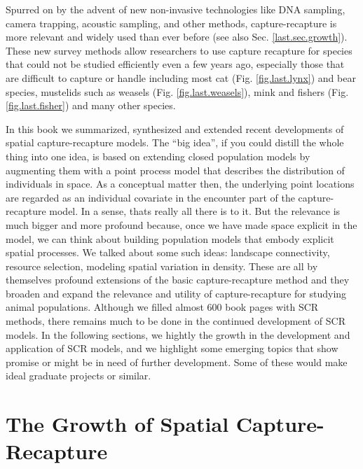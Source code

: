 Spurred on by the advent of new non-invasive technologies like DNA
sampling, camera trapping, acoustic sampling, and other methods,
capture-recapture is more relevant and widely used than ever before
(see also Sec. \ref{last.sec.growth}).  These new survey methods allow
researchers to use capture recapture for species that could not be
studied efficiently even a few years ago, especially those that are
difficult to capture or handle including most cat
(Fig. \ref{fig.last.lynx})
and bear
species, mustelids such as weasels (Fig. \ref{fig.last.weasels}), 
mink and fishers (Fig. \ref{fig.last.fisher}) and many other species. 


In this book we summarized, synthesized and extended recent
developments of spatial capture-recapture models.  The ``big idea'',
if you could distill the whole thing into one idea, is based on
extending closed population models by augmenting them with a point
process model that describes the distribution of individuals
\citep{efford:2004} in space. As a conceptual matter then, the
underlying point locations are regarded as an individual covariate in
the encounter part of the capture-recapture model. In a sense, thats
really all there is to it. But the relevance is much bigger and more
profound because, once we have made space explicit in the model, 
we can think about building population models that embody explicit
spatial processes. 
We talked about some such ideas: landscape connectivity, resource
selection, modeling spatial variation in density. These are all by
themselves profound extensions of the basic capture-recapture method
and they broaden and expand the relevance and utility of
capture-recapture for studying animal populations.
Although we filled almost 600 book pages with SCR methods,
there remains much to be done in the continued development of SCR
models. In the following sections, we hightly the growth in the
development and application of SCR models, and 
we highlight  some emerging topics that show promise or might be in
need of further development. Some of these would make ideal
graduate projects or similar.


\section{The Growth of Spatial Capture-Recapture}

